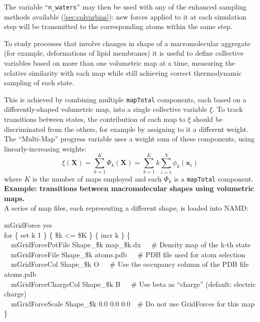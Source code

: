 {The variable ``\texttt{n\_waters}'' may then be used with any of the enhanced sampling methods available (\ref{sec:colvarbias}): new forces applied to it at each simulation step will be transmitted to the corresponding atoms within the same step.



To study processes that involve changes in shape of a macromolecular aggregate (for example, deformations of lipid membranes) it is useful to define collective variables based on more than one volumetric map at a time, measuring the relative similarity with each map while still achieving correct thermodynamic sampling of each state.

This is achieved by combining multiple \texttt{mapTotal} components, each based on a differently-shaped volumetric map, into a single collective variable $\xi$.
To track transitions between states, the contribution of each map to $\xi$ should be discriminated from the others, for example by assigning to it a different weight.
The ``Multi-Map'' progress variable \cite{Fiorin2020} uses a weight sum of these components, using linearly-increasing weights:
\begin{equation}
  \label{eq:cvc_multi_map}
    \xi(\mathbf{X}) = \sum_{k=1}^{K} \Phi_{k}(\mathbf{X}) = \sum_{k=1}^{K} k \sum_{i=1}^{N}\phi_{k}(\mathbf{x}_{i})
\end{equation}
where $K$ is the number of maps employed and each $\Phi_k$ is a \texttt{mapTotal} component.\\

\noindent\textbf{Example: transitions between macromolecular shapes using volumetric maps.}\\
A series of map files, each representing a different shape, is loaded into NAMD:\\
\begin{mdexampleinput}
  \-mGridForce yes\\
  \-for \{ set k 1 \} \{ \$k <= \$K \} \{ incr k \} \{\\
  \-~~mGridForcePotFile Shape\_\$k map\_\$k.dx~~~\# Density map of the k-th state\\
  \-~~mGridForceFile Shape\_\$k atoms.pdb~~~\# PDB file used for atom selection\\
  \-~~mGridForceCol Shape\_\$k O~~~\# Use the occupancy column of the PDB file atoms.pdb\\
  \-~~mGridForceChargeCol Shape\_\$k B~~~\# Use beta as ``charge'' (default: electric charge)\\
  \-~~mGridForceScale Shape\_\$k 0.0 0.0 0.0~~\# Do not use GridForces for this map\\
  \-\}
\end{mdexampleinput}


}
